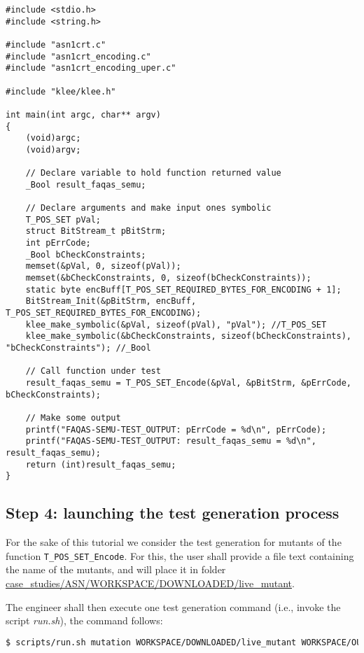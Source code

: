 \begin{lstlisting}[style=CStyle]
#include <stdio.h>
#include <string.h>

#include "asn1crt.c"
#include "asn1crt_encoding.c"
#include "asn1crt_encoding_uper.c"

#include "klee/klee.h"

int main(int argc, char** argv)
{
    (void)argc;
    (void)argv;

    // Declare variable to hold function returned value
    _Bool result_faqas_semu;

    // Declare arguments and make input ones symbolic
    T_POS_SET pVal;
    struct BitStream_t pBitStrm;
    int pErrCode;
    _Bool bCheckConstraints;
    memset(&pVal, 0, sizeof(pVal));
    memset(&bCheckConstraints, 0, sizeof(bCheckConstraints));
    static byte encBuff[T_POS_SET_REQUIRED_BYTES_FOR_ENCODING + 1];
    BitStream_Init(&pBitStrm, encBuff, T_POS_SET_REQUIRED_BYTES_FOR_ENCODING);
    klee_make_symbolic(&pVal, sizeof(pVal), "pVal"); //T_POS_SET
    klee_make_symbolic(&bCheckConstraints, sizeof(bCheckConstraints), "bCheckConstraints"); //_Bool

    // Call function under test
    result_faqas_semu = T_POS_SET_Encode(&pVal, &pBitStrm, &pErrCode, bCheckConstraints);

    // Make some output
    printf("FAQAS-SEMU-TEST_OUTPUT: pErrCode = %d\n", pErrCode);
    printf("FAQAS-SEMU-TEST_OUTPUT: result_faqas_semu = %d\n", result_faqas_semu);
    return (int)result_faqas_semu;
}
\end{lstlisting}


\subsection{Step 4: launching the test generation process}

For the sake of this tutorial we consider the test generation for mutants of the function \texttt{T\_POS\_SET\_Encode}. For this, the user shall provide a file text containing the name of the mutants, and will place it in folder \url{case\_studies/ASN/WORKSPACE/DOWNLOADED/live\_mutant}.

The engineer shall then execute one test generation command (i.e., invoke the script \emph{run.sh}), the command follows:

\begin{lstlisting}[language=bash]
 $ scripts/run.sh mutation WORKSPACE/DOWNLOADED/live_mutant WORKSPACE/OUTPUT/live_mutants_output
\end{lstlisting}

